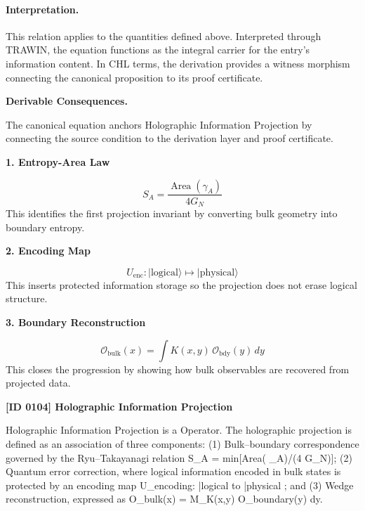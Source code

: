 \paragraph{Interpretation.}
This relation applies to the quantities defined above. Interpreted through TRAWIN, the equation functions as the integral carrier for the entry’s information content. In CHL terms, the derivation provides a witness morphism connecting the canonical proposition to its proof certificate.

\par\vspace{0.35em}
\noindent\textbf{Derivable Consequences.}\quad
\begingroup
\footnotesize
\raggedright
The canonical equation anchors Holographic Information Projection by connecting the source condition to the derivation layer and proof certificate.
\par\endgroup

\noindent\textbf{1. Entropy-Area Law}\par
\[
S_A = \frac{\operatorname{Area}(\gamma_A)}{4 G_N}
\]
\noindent This identifies the first projection invariant by converting bulk geometry into boundary entropy.\par
\noindent\textbf{2. Encoding Map}\par
\[
U_{\mathrm{enc}} : \lvert \mathrm{logical}\rangle \mapsto \lvert \mathrm{physical}\rangle
\]
\noindent This inserts protected information storage so the projection does not erase logical structure.\par
\noindent\textbf{3. Boundary Reconstruction}\par
\[
\mathcal{O}_{\mathrm{bulk}}(x)=\int K(x,y)\,\mathcal{O}_{\mathrm{bdy}}(y)\,dy
\]
\noindent This closes the progression by showing how bulk observables are recovered from projected data.\par

\clearpage
\noindent\textbf{[ID 0104] Holographic Information Projection}\par
\vspace{0.35em}
\begingroup\small
{}
Holographic Information Projection is a Operator. The holographic projection is defined as an association of three components: (1) Bulk--boundary correspondence governed by the Ryu--Takayanagi relation S\_A = min[Area( \_A)/(4 G\_N)]; (2) Quantum error correction, where logical information encoded in bulk states is protected by an encoding map U\_encoding: |logical  to |physical ; and (3) Wedge reconstruction, expressed as O\_bulk(x) =   M\_K(x,y) O\_boundary(y) dy.

